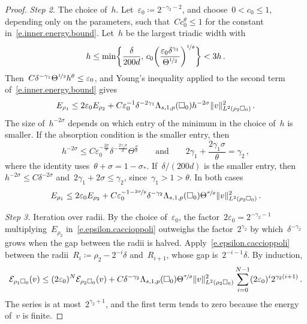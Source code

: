 \documentclass[11pt,letterpaper]{article}
\numberwithin{equation}{section}
\theoremstyle{definition}
\newcommand{\eps}{\varepsilon}
\newcommand{\nf}{\nicefrac}
\newcommand{\cu}{\square}
\DeclarePairedDelimiter{\norm}{\lVert}{\rVert}
\newcommand{\Ener}{\mathcal E}
\begin{document}
\begin{proof}
\emph{Step 2.} The choice of~$h$. Let~$\eps_0\coloneqq2^{-\gamma_2-2}$, and choose~$0<c_0\leq1$, depending only on the parameters, such that~$Cc_0^\theta\leq1$ for the constant in~\eqref{e.inner.energy.bound}. Let~$h$ be the largest triadic width with
\begin{equation*}
	h\leq\min\biggl\{\frac{\delta}{200d},\,c_0\biggl(\frac{\eps_0\delta^{\gamma_1}}{\Theta^{\nf12}}\biggr)^{\nf1\theta}\biggr\}<3h\,.
\end{equation*}
Then~$C\delta^{-\gamma_1}\Theta^{\nf12}h^\theta\leq\eps_0$, and Young's inequality applied to the second term of~\eqref{e.inner.energy.bound} gives
\begin{equation*}
	E_{\rho_1}\leq2\eps_0 E_{\rho_2}+C\eps_0^{-1}\delta^{-2\gamma_1}\Lambda_{s,1,p}(\cu_0)h^{-2\sigma}\norm{v}_{L^2(\rho_2\cu_0)}^2\,.
\end{equation*}
The size of~$h^{-2\sigma}$ depends on which entry of the minimum in the choice of~$h$ is smaller. If the absorption condition is the smaller entry, then
\begin{equation*}
	h^{-2\sigma}\leq C\eps_0^{-\frac{2\sigma}{\theta}}\delta^{-\frac{2\gamma_1\sigma}{\theta}}\Theta^{\frac\sigma\theta}\qquad\mbox{and}\qquad2\gamma_1+\frac{2\gamma_1\sigma}{\theta}=\gamma_2\,,
\end{equation*}
where the identity uses~$\theta+\sigma=1-\sigma_*$. If~$\delta/(200d)$ is the smaller entry, then~$h^{-2\sigma}\leq C\delta^{-2\sigma}$ and~$2\gamma_1+2\sigma\leq\gamma_2$, since~$\gamma_1>1>\theta$. In both cases
\begin{equation}
	E_{\rho_1}\leq2\eps_0 E_{\rho_2}+C\eps_0^{-1-\nf{2\sigma}\theta}\delta^{-\gamma_2}\Lambda_{s,1,p}(\cu_0)\Theta^{\nf\sigma\theta}\norm{v}_{L^2(\rho_2\cu_0)}^2\,.
	\label{e.epsilon.caccioppoli}
\end{equation}

\smallskip

\emph{Step 3.} Iteration over radii. By the choice of~$\eps_0$, the factor~$2\eps_0=2^{-\gamma_2-1}$ multiplying~$E_{\rho_2}$ in~\eqref{e.epsilon.caccioppoli} outweighs the factor~$2^{\gamma_2}$ by which~$\delta^{-\gamma_2}$ grows when the gap between the radii is halved. Apply~\eqref{e.epsilon.caccioppoli} between the radii~$R_i\coloneqq\rho_2-2^{-i}\delta$ and~$R_{i+1}$, whose gap is~$2^{-i-1}\delta$. By induction,
\begin{equation*}
	\Ener_{\rho_1\cu_0}(v)\leq(2\eps_0)^N\Ener_{\rho_2\cu_0}(v)+C\delta^{-\gamma_2}\Lambda_{s,1,p}(\cu_0)\Theta^{\nf\sigma\theta}\norm{v}_{L^2(\rho_2\cu_0)}^2\sum_{i=0}^{N-1}(2\eps_0)^i2^{\gamma_2(i+1)}\,.
\end{equation*}
The series is at most~$2^{\gamma_2+1}$, and the first term tends to zero because the energy of~$v$ is finite.
\end{proof}
\end{document}
